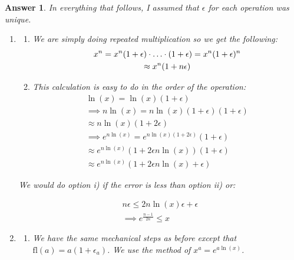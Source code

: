 \documentclass[12pt]{article}
\theoremstyle{colon}
\newtheorem*{answer}{Answer}
\begin{document}
\begin{answer}
  In everything that follows, I assumed that $\epsilon$ for each operation was unique.

  \begin{enumerate}[label=\alph*)]
    \item

      \begin{enumerate}[label=\roman*)]
        \item We are simply doing repeated multiplication so we get the following:
          \begin{gather*}
            x^n = x^n (1+\epsilon) \cdot \mathellipsis \cdot (1+\epsilon) = x^n (1+\epsilon)^n \\
            \approx x^n (1+n\epsilon)
          \end{gather*}

        \item This calculation is easy to do in the order of the operation:
          \begin{gather*}
            \ln(x) = \ln(x) (1+\epsilon) \\
            \implies n \ln(x) = n \ln(x) (1+\epsilon)(1+\epsilon) \\
            \approx n \ln(x) (1+2\epsilon) \\
            \implies e^{n \ln(x)} = e^{n \ln(x) (1+2\epsilon)} (1+\epsilon) \\
            \approx e^{n \ln(x)} (1 + 2 \epsilon n \ln(x))(1+\epsilon) \\
            \approx e^{n \ln(x)} (1 + 2 \epsilon n \ln(x) + \epsilon)
          \end{gather*}

      \end{enumerate}

      We would do option i) if the error is less than option ii) or:

      \begin{gather*}
      n \epsilon \leq 2 n \ln(x) \epsilon + \epsilon \\
      \implies e^{\frac{n-1}{2n}} \leq x
      \end{gather*}

    \item

      \begin{enumerate}[label=\roman*)]
        \item We have the same mechanical steps as before except that $\text{fl}(a) = a (1+\epsilon_a)$. We use the method of $x^a = e^{a \ln(x)}$.


\end{enumerate}
\end{enumerate}
\end{answer}
\end{document}
